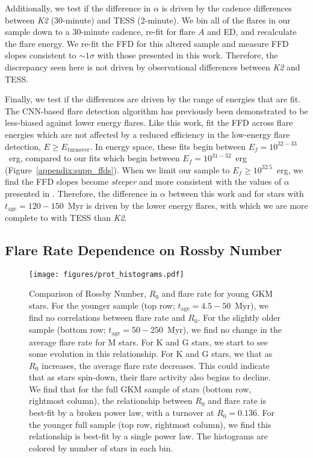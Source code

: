 \documentclass[twocolumn]{aastex631}
\begin{document}
Additionally, we test if the difference in $\alpha$ is driven by the cadence
differences between \textit{K2} (30-minute) and TESS (2-minute). We bin all of
the flares in our sample down to a 30-minute cadence, re-fit for flare $A$ and ED,
and recalculate the flare energy. We re-fit the FFD for this altered sample and
measure  FFD slopes consistent to $\sim 1 \sigma$ with those presented in this work.
Therefore, the discrepancy seen here is not driven by observational differences
between \textit{K2} and TESS.

Finally, we test if the differences are driven by the range of energies that are fit.
The CNN-based flare detection algorithm has previously been demonstrated to be
less-biased against lower energy flares. Like this work, \cite{ilin21} fit the FFD
across flare energies which are not affected by a reduced efficiency in the low-energy
flare detection, $E \geq E_\textrm{turnover}$. In energy space, these fits begin
between $E_f = 10^{32-33}$~erg, compared to our fits which begin between
$E_f = 10^{31-32}$~erg (Figure~\ref{appendix:supp_ffds}). When we limit our sample
to $E_f \geq 10^{32.5}$~erg, we find the FFD slopes become \textit{steeper} and
more consistent with the values of $\alpha$ presented in \cite{ilin21}. Therefore,
the difference in $\alpha$ between this work and \cite{ilin21} for stars with
$t_\textrm{age} = 120 - 150$~Myr is driven by the lower energy flares, with which
we are more complete to with TESS than \textit{K2}.


\subsection{Flare Rate Dependence on Rossby Number}\label{subsec:rossby}

\begin{figure*}[htb!]
    \begin{centering}
        \texttt{[image: figures/prot\_histograms.pdf]}
        \caption{
            Comparison of Rossby Number, $R_0$ and flare rate for young GKM stars.
            For the younger sample (top row; $t_\textrm{age} = 4.5 - 50$~Myr), we
            find no correlations between flare rate and $R_0$. For the slightly
            older sample (bottom row; $t_\textrm{age} = 50 - 250$~Myr), we find
            no change in the average flare rate for M stars. For K and G stars,
            we start to see some evolution in this relationship. For K and G
            stars, we that as $R_0$ increases, the average flare rate decreases.
            This could indicate that as stars spin-down, their flare activity
            also begins to decline. We find that for the full GKM sample of
            stars (bottom row, rightmost column), the relationship between $R_0$
            and flare rate is best-fit by a broken power law, with a turnover
            at $R_0 = 0.136$. For the younger full sample (top row, rightmost column),
            we find this relationship is best-fit by a single power law. The
            histograms are colored by number of stars in each bin.
        }
        \label{fig:prot_histograms}
    \end{centering}
\end{figure*}
\end{document}
